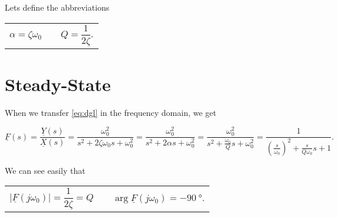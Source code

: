 \documentclass{article}[11pt]
\begin{document}
Lets define the abbreviations
\begin{center}
\begin{tabular}{p{4cm}p{2cm}p{4cm}}
  \begin{equation}
    \alpha = \zeta \omega_0
  \end{equation}
  &
  &
  \begin{equation}
    Q =\frac{1}{2\zeta}.
  \end{equation}
\end{tabular}
\end{center}

\newpage

\section{Steady-State}

When we transfer \eqref{eq:dgl} in the frequency domain, we get

\begin{equation}\label{eq:fs}
\underline{F}(s) = \frac{\underline{Y}(s)}{\underline{X}(s)} 
                 = \frac{\omega_0^2}{s^2 + 2 \zeta \omega_0 s + \omega_0^2 }
                 = \frac{\omega_0^2}{s^2 + 2 \alpha s + \omega_0^2 }
                 = \frac{\omega_0^2}{s^2 + \frac{\omega_0}{Q} s + \omega_0^2 }
                 = \frac{1}{\left(\frac{s}{\omega_0}\right)^2 + \frac{s}{Q\omega_0} s + 1 }
.
\end{equation}

We can see easily that
\begin{center}
\begin{tabular}{p{5cm}p{2cm}p{5cm}}
  \begin{equation}
    \left|\underline{F}(j\omega_0)\right| = \frac{1}{2 \zeta} = Q
  \end{equation}
  &
  &
  \begin{equation}\label{eq:argf0}
    \arg{\underline{F}(j\omega_0)} = -\SI{90}{\degree}.
  \end{equation}
\end{tabular}
\end{center}
\end{document}
